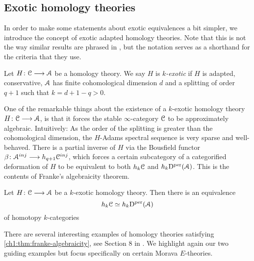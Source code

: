 



\subsection{Exotic homology theories}


In order to make some statements about exotic equivalences a bit simpler, we introduce the concept of exotic adapted homology theories. Note that this is not the way similar results are phrased in \cite{patchkoria-pstragowski_2021}, but the notation serves as a shorthand for the criteria that they use. 

\begin{definition}
    \label{ch1:def:k-exotic-homology-theory}
     Let $H\colon \EuScript{C}\longrightarrow \EuScript{A}$ be a homology theory. We say $H$ is \emph{$k$-exotic} if $H$ is adapted, conservative, $\EuScript{A}$ has finite cohomological dimension $d$ and a splitting of order $q+1$ such that $k=d+1-q>0$. 
\end{definition}
    
One of the remarkable things about the existence of a $k$-exotic homology theory $H\colon \EuScript{C}\longrightarrow \EuScript{A}$, is that it forces the stable $\infty$-category $\EuScript{C}$ to be approximately algebraic. Intuitively: As the order of the splitting is greater than the cohomological dimension, the $H$-Adams spectral sequence is very sparse and well-behaved. There is a partial inverse of $H$ via the Bousfield functor $\beta\colon \EuScript{A}^{inj}\longrightarrow h_{q+1} \EuScript{C}^{inj}$, which forces a certain subcategory of a categorified deformation of $H$ to be equivalent to both $h_k \EuScript{C}$ and $h_k \mathrm{D}^{\mathrm{per}}(\EuScript{A})$. This is the contents of Franke's algebraicity theorem. 
    
\begin{theorem}
    \label{ch1:thm:franke-algebraicity}
    Let $H\colon \EuScript{C}\longrightarrow \EuScript{A}$ be a $k$-exotic homology theory. Then there is an equivalence  
    \[h_k \EuScript{C} \simeq h_k \mathrm{D}^{\mathrm{per}}(\EuScript{A})\]
    of homotopy $k$-categories
\end{theorem}
    
There are several interesting examples of homology theories satisfying \cref{ch1:thm:franke-algebraicity}, see Section 8 in \cite{patchkoria-pstragowski_2021}. We highlight again our two guiding examples but focus specifically on certain Morava $E$-theories. 

